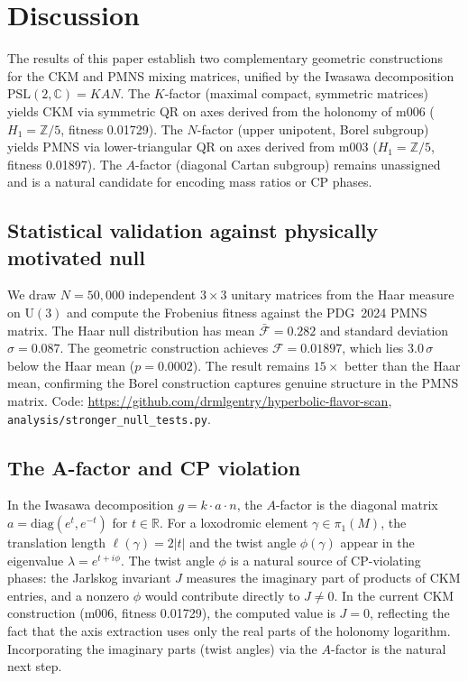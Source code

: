 \documentclass[floatfix,aps,prd,twocolumn,showpacs,superscriptaddress,longbibliography]{revtex4-2}
\newcommand{\PSL}{\mathrm{PSL}(2,\mathbb{C})}
\begin{document}
\section{Discussion}
\label{sec:discussion}

The results of this paper establish two complementary geometric
constructions for the CKM and PMNS mixing matrices, unified by the
Iwasawa decomposition $\PSL = KAN$.
The $K$-factor (maximal compact, symmetric matrices) yields CKM
via symmetric QR on axes derived from the holonomy of m006
($H_1 = \mathbb{Z}/5$, fitness 0.01729).
The $N$-factor (upper unipotent, Borel subgroup) yields PMNS
via lower-triangular QR on axes derived from m003
($H_1 = \mathbb{Z}/5$, fitness 0.01897).
The $A$-factor (diagonal Cartan subgroup) remains unassigned and
is a natural candidate for encoding mass ratios or CP phases.


\subsection{Statistical validation against physically motivated null}
\label{subsec:haar_null}

We draw $N = 50{,}000$ independent $3\times3$ unitary matrices
from the Haar measure on $\mathrm{U}(3)$ and compute the Frobenius
fitness against the PDG~2024 PMNS matrix.
The Haar null distribution has mean $\bar{\mathcal{F}} = 0.282$
and standard deviation $\sigma = 0.087$.
The geometric construction achieves $\mathcal{F} = 0.01897$,
which lies $3.0\,\sigma$ below the Haar mean ($p = 0.0002$).
The result remains $15\times$ better than the Haar mean, confirming
the Borel construction captures genuine structure in the PMNS matrix.
Code: \url{https://github.com/drmlgentry/hyperbolic-flavor-scan},
\texttt{analysis/stronger\_null\_tests.py}.

\subsection{The A-factor and CP violation}

In the Iwasawa decomposition $g = k \cdot a \cdot n$, the $A$-factor
is the diagonal matrix $a = \mathrm{diag}(e^t, e^{-t})$ for $t \in \mathbb{R}$.
For a loxodromic element $\gamma \in \pi_1(M)$, the translation
length $\ell(\gamma) = 2|t|$ and the twist angle $\phi(\gamma)$
appear in the eigenvalue $\lambda = e^{t + i\phi}$.
The twist angle $\phi$ is a natural source of CP-violating phases:
the Jarlskog invariant $J$ measures the imaginary part of products
of CKM entries, and a nonzero $\phi$ would contribute directly
to $J \neq 0$.
In the current CKM construction (m006, fitness 0.01729), the
computed value is $J = 0$, reflecting the fact that the axis
extraction uses only the real parts of the holonomy logarithm.
Incorporating the imaginary parts (twist angles) via the $A$-factor
is the natural next step.
\end{document}
